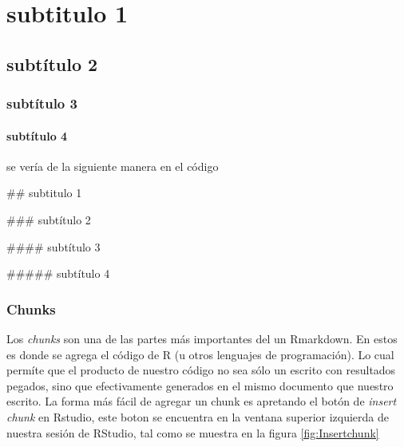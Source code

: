 \documentclass[]{book}
\newenvironment{Shaded}{\begin{snugshade}}{\end{snugshade}}
\newcommand{\NormalTok}[1]{#1}
\let\oldparagraph\paragraph
\renewcommand{\paragraph}[1]{\oldparagraph{#1}\mbox{}}
\begin{document}
\hypertarget{subtitulo-1}{%
\section*{subtitulo 1}\label{subtitulo-1}}

\hypertarget{subtitulo-2}{%
\subsection*{subtítulo 2}\label{subtitulo-2}}

\hypertarget{subtitulo-3}{%
\subsubsection*{subtítulo 3}\label{subtitulo-3}}

\hypertarget{subtitulo-4}{%
\paragraph{subtítulo 4}\label{subtitulo-4}}

se vería de la siguiente manera en el código

\begin{Shaded}
\begin{Highlighting}[]
\NormalTok{## subtitulo 1}

\NormalTok{### subtítulo 2}

\NormalTok{#### subtítulo 3}

\NormalTok{##### subtítulo 4}
\end{Highlighting}
\end{Shaded}

\hypertarget{chunks}{%
\subsubsection{Chunks}\label{chunks}}

Los \emph{chunks} son una de las partes más importantes del un
Rmarkdown. En estos es donde se agrega el código de R (u otros lenguajes
de programación). Lo cual permíte que el producto de nuestro código no
sea sólo un escrito con resultados pegados, sino que efectivamente
generados en el mismo documento que nuestro escrito. La forma más fácil
de agregar un chunk es apretando el botón de \emph{insert chunk} en
Rstudio, este boton se encuentra en la ventana superior izquierda de
nuestra sesión de RStudio, tal como se muestra en la figura
\ref{fig:Insertchunk}
\end{document}
